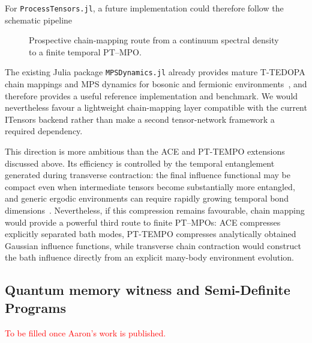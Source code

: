 For \texttt{ProcessTensors.jl}, a future implementation could therefore follow the schematic pipeline
%
\begin{figure}[H]
    \centering
    \caption{Prospective chain-mapping route from a continuum spectral density to a finite temporal PT--MPO.}
    \label{fig:roadmap-chainmapping-pipeline}
\end{figure}
%
The existing Julia package \texttt{MPSDynamics.jl} already provides mature T-TEDOPA chain mappings and MPS dynamics for bosonic and fermionic environments~\cite{lacroix2024mpsdynamics}, and therefore provides a useful reference implementation and benchmark.
We would nevertheless favour a lightweight chain-mapping layer compatible with the current ITensors backend rather than make a second tensor-network framework a required dependency.

This direction is more ambitious than the ACE and PT-TEMPO extensions discussed above.
Its efficiency is controlled by the temporal entanglement generated during transverse contraction: the final influence functional may be compact even when intermediate tensors become substantially more entangled, and generic ergodic environments can require rapidly growing temporal bond dimensions~\cite{ye2021influence,cerezo2025spatiotemporal}.
Nevertheless, if this compression remains favourable, chain mapping would provide a powerful third route to finite PT--MPOs: ACE compresses explicitly separated bath modes, PT-TEMPO compresses analytically obtained Gaussian influence functions, while transverse chain contraction would construct the bath influence directly from an explicit many-body environment evolution.

\subsection{Quantum memory witness and Semi-Definite Programs}
\label{subsec:roadmap-quantum-memory}

\textcolor{red}{To be filled once Aaron's work is published.}
